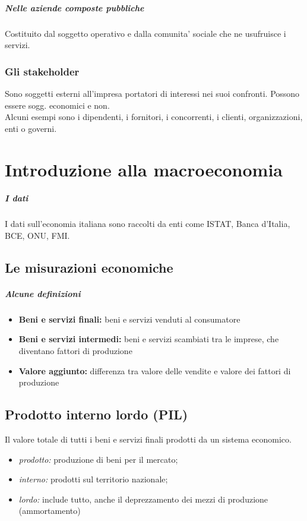 \documentclass{report}
\begin{document}
	\paragraph{Nelle aziende composte pubbliche}Costituito dal soggetto operativo e dalla comunita' sociale che ne usufruisce i servizi.
	\subsection{Gli stakeholder}
	Sono soggetti esterni all'impresa portatori di interessi nei suoi confronti. Possono essere sogg. economici e non.\medskip \\Alcuni esempi sono i dipendenti, i fornitori, i concorrenti, i clienti, organizzazioni, enti o governi.
	
	\chapter{Introduzione alla macroeconomia}
	\paragraph{I dati} I dati sull'economia italiana sono raccolti da enti come ISTAT, Banca d'Italia, BCE, ONU, FMI.
	\section{Le misurazioni economiche}
	\paragraph{Alcune definizioni}
	\begin{itemize}
		\item \textbf{Beni e servizi finali:} beni e servizi venduti al consumatore
		\item \textbf{Beni e servizi intermedi:} beni e servizi scambiati tra le imprese, che diventano fattori di produzione
		\item \textbf{Valore aggiunto:} differenza tra valore delle vendite e valore dei fattori di produzione
	\end{itemize}
	\section{Prodotto interno lordo (PIL)}
	Il valore totale di tutti i beni e servizi finali prodotti da un sistema economico.
	\begin{itemize}
		\item \textit{prodotto:} produzione di beni per il mercato;
		\item \textit{interno:} prodotti sul territorio nazionale;
		\item \textit{lordo:} include tutto, anche il deprezzamento dei mezzi di produzione (ammortamento)
	\end{itemize}
\end{document}

